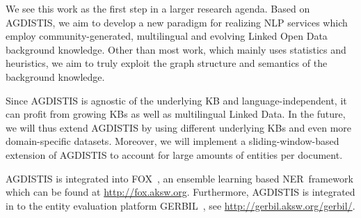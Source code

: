 We see this work as the first step in a larger research agenda.
Based on AGDISTIS, we aim to develop a new paradigm for realizing \ac{NLP} services which employ community-generated, multilingual and evolving Linked Open Data background knowledge.
Other than most work, which mainly uses statistics and heuristics, we aim to truly exploit the graph structure and semantics of the background knowledge.

Since AGDISTIS is agnostic of the underlying \ac{KB} and language-independent, it can profit from growing \ac{KB}s as well as multilingual Linked Data.
In the future, we will thus extend AGDISTIS by using different underlying \ac{KB}s and even more domain-specific datasets.
Moreover, we will implement a sliding-window-based extension of AGDISTIS to account for large amounts of entities per document.
%



AGDISTIS is integrated into FOX~\cite{FOX}, an ensemble learning based \ac{NER}~framework which can be found at \url{http://fox.aksw.org}. 
Furthermore, AGDISTIS is integrated in to the entity evaluation platform GERBIL~\cite{GERBIL}, see \url{http://gerbil.aksw.org/gerbil/}.